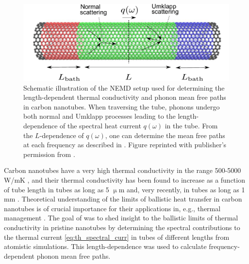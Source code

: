 \begin{figure}[tb]
 \begin{center}
  \includegraphics[width=.89\columnwidth]{pics/cnt_fig1-crop.pdf} 
  \caption{Schematic illustration of the NEMD setup used for determining the length-dependent thermal conductivity and phonon mean free paths in carbon nanotubes. When traversing the tube, phonons undergo both normal and Umklapp processes leading to the length-dependence of the spectral heat current $q(\omega)$ in the tube. From the $L$-dependence of $q(\omega)$, one can determine the mean free paths at each frequency as described in . Figure reprinted with publisher's permission from .}  
\label{fig:cnt_fig1}
 \end{center}
\end{figure}

Carbon nanotubes have a very high thermal conductivity in the range 500-5000 W/mK \cite{marconnet13}, and their thermal conductivity has been found to increase as a function of tube length in tubes as long as 5 $\upmu$m \cite{chang08} and, very recently, in tubes as long as 1 mm \cite{chang_personal}. Theoretical understanding of the limits of ballistic heat transfer in carbon nanotubes is of crucial importance for their applications in, e.g., thermal management \cite{biercuk02,huang05}. The goal of  was to shed insight to the ballistic limits of thermal conductivity in pristine nanotubes by determining the spectral contributions to the thermal current \eqref{eq:th_spectral_curr} in tubes of different lengths from atomistic simulations. This length-dependence was used to calculate frequency-dependent phonon mean free paths. %

